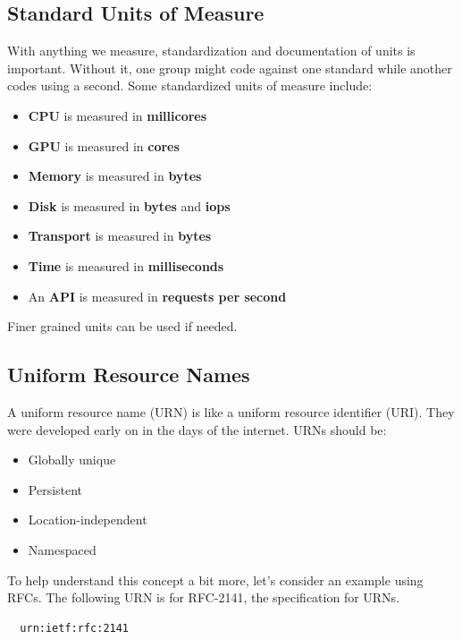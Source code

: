 \documentclass[10pt, a4paper, twocolumn]{article}
\begin{document}
  \subsection*{Standard Units of Measure}
    With anything we measure, standardization and documentation of units is important.
    Without it, one group might code against one standard while another codes using a second.
    Some standardized units of measure include:

    \begin{itemize}
      \item \textbf{CPU} is measured in \textbf{millicores}
      \item \textbf{GPU} is measured in \textbf{cores}
      \item \textbf{Memory} is measured in \textbf{bytes}
      \item \textbf{Disk} is measured in \textbf{bytes} and \textbf{iops}
      \item \textbf{Transport} is measured in \textbf{bytes}
      \item \textbf{Time} is measured in \textbf{milliseconds}
      \item An \textbf{API} is measured in \textbf{requests per second}
    \end{itemize}

    Finer grained units can be used if needed.

  \subsection*{Uniform Resource Names}
    A uniform resource name (URN) is like a uniform resource identifier (URI).
    They were developed early on in the days of the internet.
    URNs should be:

    \begin{itemize}
      \item Globally unique
      \item Persistent
      \item Location-independent
      \item Namespaced
    \end{itemize}

    To help understand this concept a bit more, let's consider an example using RFCs.
    The following URN is for RFC-2141, the specification for URNs.

\begin{verbatim}
  urn:ietf:rfc:2141
\end{verbatim}
\end{document}
